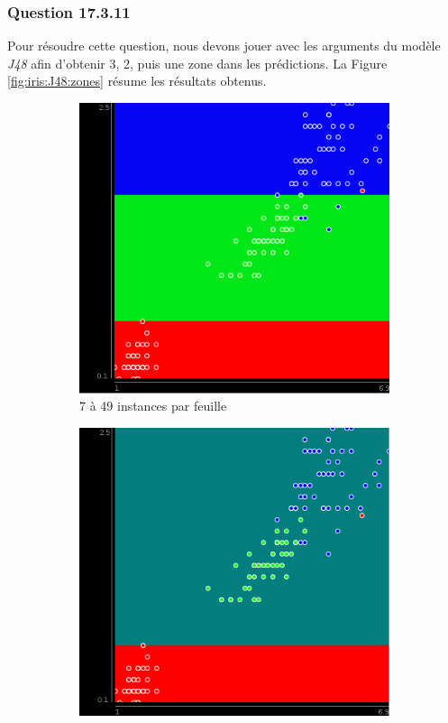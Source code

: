 \documentclass[11pt,a4paper]{article}
\begin{document}
   	
		   	\subsubsection*{Question 17.3.11}
		   	
		   	Pour résoudre cette question, nous devons jouer avec les arguments du modèle \textit{J48} afin d'obtenir 3, 2, puis une zone dans les prédictions. La Figure \ref{fig:iris:J48:zones} résume les résultats obtenus.
		   	
		   	\begin{figure}[h]
		   		\centering
		   		\begin{subfigure}{.333\textwidth}
		   			\centering
		   			\includegraphics[width=.9\textwidth]{iris_J48_3zones}
		   			\caption{7 à 49 instances par feuille}
		   		\end{subfigure}%
		   		\begin{subfigure}{.333\textwidth}
		   			\centering
		   			\includegraphics[width=.9\textwidth]{iris_J48_2zones}

\end{subfigure}
\end{figure}
\end{document}
